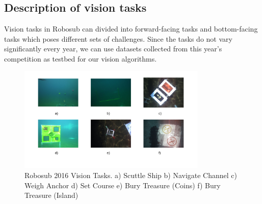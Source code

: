 \documentclass[fypca]{socreport}
\begin{document}
\subsection{Description of vision tasks}
Vision tasks in Robosub can divided into forward-facing tasks and
bottom-facing tasks which poses different sets of challenges. Since the
tasks do not vary significantly every year, we can use datasets
collected from this year's competition as testbed for our vision
algorithms.

\begin{figure}[ht]
\centering

        \includegraphics[width=0.8\textwidth, height=0.3\textheight]{robosub_vision_tasks.png}
        \caption{Robosub 2016 Vision Tasks. a) Scuttle Ship b) Navigate
        Channel c) Weigh Anchor d) Set Course e) Bury Treasure (Coins)
        f) Bury Treasure (Island)}
        \label{fig:robosub2016_tasks}

\end{figure}
\end{document}
